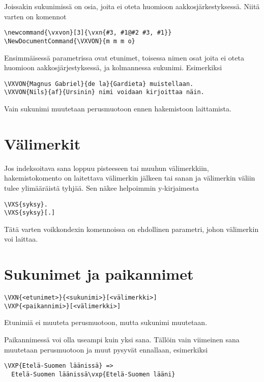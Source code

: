 \documentclass[12pt]{article}
\begin{document}
Joissakin sukunimissä on osia, joita ei oteta huomioon
aakkosjärkestyksessä. Niitä varten on komennot

\begin{verbatim}
\newcommand{\vxvon}[3]{\vxn{#3, #1@#2 #3, #1}}
\NewDocumentCommand{\VXVON}{m m m o}
\end{verbatim}

Ensimmäisessä parametrissa ovat etunimet, toisessa nimen osat joita
ei oteta huomioon aakkosjärjestyksessä, ja kolmannessa sukunimi.
Esimerkiksi

\begin{verbatim}
\VXVON{Magnus Gabriel}{de la}{Gardieta} muistellaan.
\VXVON{Nils}{af}{Ursinin} nimi voidaan kirjoittaa näin.
\end{verbatim}

Vain sukunimi muutetaan perusmuotoon ennen hakemistoon laittamista.


\section*{Välimerkit}


Jos indeksoitava sana loppuu pisteeseen tai muuhun välimerkkiin,
hakemistokomento on laitettava välimerkin jälkeen tai sanan ja
välimerkin väliin tulee ylimääräistä tyhjää. Sen näkee helpoimmin
y-kirjaimesta

\begin{verbatim}
\VXS{syksy}.
\VXS{syksy}[.]
\end{verbatim}


Tätä varten voikkondexin komennoissa on ehdollinen parametri, johon
välimerkin voi laittaa.


\section*{Sukunimet ja paikannimet}

\begin{verbatim}
\VXN{<etunimet>}{<sukunimi>}[<välimerkki>]
\VXP{<paikannimi>}[<välimerkki>]
\end{verbatim}

Etunimiä ei muuteta perusmuotoon, mutta sukunimi muutetaan.

Paikannimessä voi olla useampi kuin yksi sana. Tällöin vain viimeinen
sana muutetaan perusmuotoon ja muut pysyvät ennallaan, esimerkiksi

\begin{verbatim}
\VXP{Etelä-Suomen läänissä} =>
  Etelä-Suomen läänissä\vxp{Etelä-Suomen lääni}
\end{verbatim}
\end{document}
